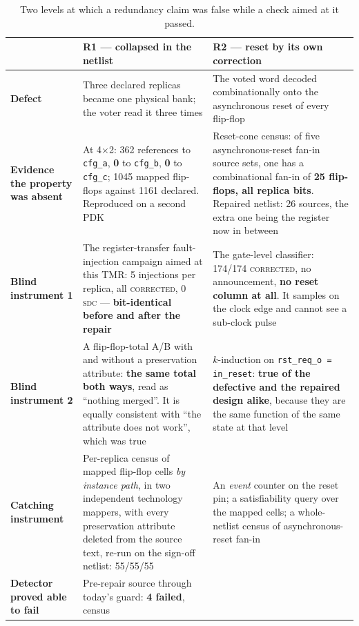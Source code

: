 \documentclass[11pt,a4paper]{article}
\begin{document}
\begin{table}[htbp]
\centering
\caption{Two levels at which a redundancy claim was false while a check
aimed at it passed.}
\label{tab:evidence}
\small
\begin{tabularx}{\textwidth}{L{2.4cm}XX}
\toprule
& \textbf{R1 --- collapsed in the netlist} & \textbf{R2 --- reset by its
own correction} \\
\midrule
\textbf{Defect} &
Three declared replicas became one physical bank; the voter read it three
times &
The voted word decoded combinationally onto the asynchronous reset of
every flip-flop \\
\addlinespace
\textbf{Evidence the property was absent} &
At 4$\times$2: 362 references to \texttt{cfg\_a}, \textbf{0} to
\texttt{cfg\_b}, \textbf{0} to \texttt{cfg\_c}; \num{1045} mapped
flip-flops against \num{1161} declared. Reproduced on a second PDK &
Reset-cone census: of five asynchronous-reset fan-in source sets, one has
a combinational fan-in of \textbf{25 flip-flops, all replica bits}.
Repaired netlist: 26 sources, the extra one being the register now in
between \\
\addlinespace
\textbf{Blind instrument 1} &
The register-transfer fault-injection campaign aimed at this TMR:
5 injections per replica, all \textsc{corrected}, 0 \textsc{sdc} ---
\textbf{bit-identical before and after the repair} &
The gate-level classifier: 174/174 \textsc{corrected}, no announcement,
\textbf{no reset column at all}. It samples on the clock edge and cannot
see a sub-clock pulse \\
\addlinespace
\textbf{Blind instrument 2} &
A flip-flop-total A/B with and without a preservation attribute:
\textbf{the same total both ways}, read as ``nothing merged''. It is
equally consistent with ``the attribute does not work'', which was true &
$k$-induction on
\texttt{rst\_req\_o = in\_reset}: \textbf{true of the defective and the
repaired design alike}, because they are the same function of the same
state at that level \\
\addlinespace
\textbf{Catching instrument} &
Per-replica census of mapped flip-flop cells \emph{by instance path}, in
two independent technology mappers, with every preservation attribute
deleted from the source text, re-run on the sign-off netlist: 55/55/55 &
An \emph{event} counter on the reset pin; a satisfiability query over the
mapped cells; a whole-netlist census of asynchronous-reset fan-in \\
\addlinespace
\textbf{Detector proved able to fail} &
Pre-repair source through today's guard: \textbf{4 failed}, census

\end{tabularx}
\end{table}
\end{document}
